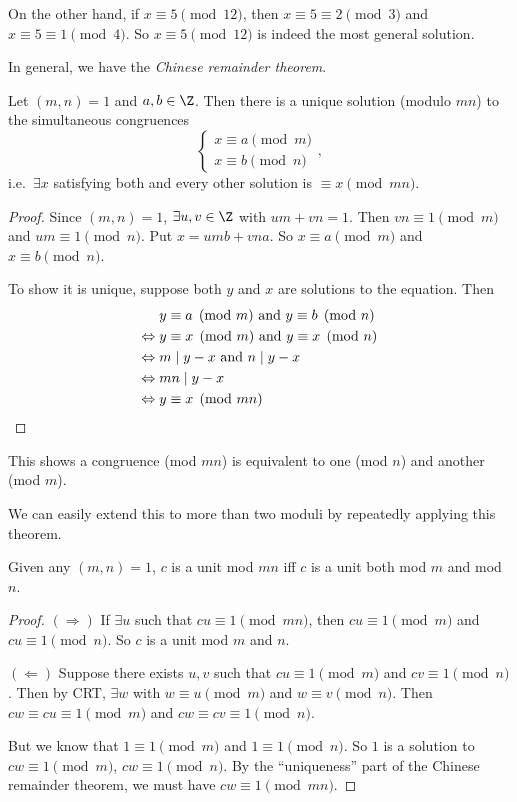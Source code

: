 \documentclass[a4paper]{article}
\begin{document}
On the other hand, if $x\equiv 5\pmod {12}$, then $x\equiv 5\equiv 2 \pmod 3$ and $x\equiv 5\equiv 1\pmod 4$. So $x\equiv 5\pmod {12}$ is indeed the most general solution.

In general, we have the \emph{Chinese remainder theorem}.
\begin{thm}
  Let $(m, n) = 1$ and $a, b\in \Z$. Then there is a unique solution (modulo $mn$) to the simultaneous congruences
  \[
    \begin{cases}x\equiv a\pmod m \\ x\equiv b\pmod n \end{cases},
  \]
  i.e.\ $\exists x$ satisfying both and every other solution is $\equiv x \pmod {mn}$.
\end{thm}

\begin{proof}
  Since $(m, n) = 1$, $\exists u, v\in \Z$ with $um + vn = 1$. Then $vn \equiv 1\pmod m$ and $um \equiv 1 \pmod n$. Put $x = umb + vna$. So $x\equiv a\pmod m$ and $x\equiv b\pmod n$.

  To show it is unique, suppose both $y$ and $x$ are solutions to the equation. Then
  \begin{align*}
    &\; y \equiv a\pmod m \text{ and } y \equiv b\pmod n\\
    \Leftrightarrow &\; y \equiv x\pmod m \text{ and } y\equiv x\pmod n\\
    \Leftrightarrow &\; m \mid y - x\text{ and } n \mid y - x\\
    \Leftrightarrow &\; mn \mid y - x\\
    \Leftrightarrow &\; y \equiv x\pmod {mn}\qedhere
  \end{align*}
\end{proof}
This shows a congruence (mod $mn$) is equivalent to one (mod $n$) and another (mod $m$).

We can easily extend this to more than two moduli by repeatedly applying this theorem.

\begin{prop}
  Given any $(m,n) = 1$, $c$ is a unit mod $mn$ iff $c$ is a unit both mod $m$ and mod $n$.
\end{prop}

\begin{proof}
  $(\Rightarrow)$ If $\exists u$ such that $cu \equiv 1 \pmod {mn}$, then $cu \equiv 1\pmod m$ and $cu\equiv 1\pmod n$. So $c$ is a unit mod $m$ and $n$.

  $(\Leftarrow)$ Suppose there exists $u, v$ such that $cu\equiv 1\pmod m$ and $cv \equiv 1\pmod n$. Then by CRT, $\exists w$ with $w\equiv u \pmod m$ and $w\equiv v\pmod n$. Then $cw\equiv cu\equiv 1\pmod m$ and $cw\equiv cv\equiv 1\pmod n$.

  But we know that $1\equiv 1\pmod m$ and $1\equiv 1\pmod n$. So $1$ is a solution to $cw \equiv 1\pmod m$, $cw\equiv 1\pmod n$. By the ``uniqueness'' part of the Chinese remainder theorem, we must have $cw\equiv 1\pmod {mn}$.
\end{proof}
\end{document}
